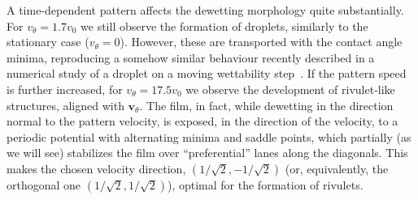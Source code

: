 \documentclass[twocolumn,amsmath,amssymb,showpacs,prl,superscriptaddress]{revtex4-1} %
\begin{document}
A time-dependent pattern affects the dewetting morphology quite substantially.
For $v_{\theta} = 1.7 v_0$ we still observe the formation of droplets, similarly to the stationary case ($v_{\theta} = 0$). However, these are transported with the contact angle minima, reproducing a somehow similar behaviour recently described in a numerical study of a droplet on a moving wettability step~\cite{GrawitterStark1}.
If the pattern speed is further increased, for $v_{\theta} = 17.5 v_0$ we observe the development of rivulet-like structures, aligned with $\mathbf{v}_{\theta}$. 
The film, in fact, while dewetting in the direction normal to the pattern velocity, is exposed, in the direction of the velocity, to a periodic potential with alternating minima and saddle points, which partially (as we will see) stabilizes the film over ``preferential'' lanes along the diagonals. 
This makes the chosen velocity direction, $(1/\sqrt{2},-1/\sqrt{2})$ (or, equivalently, the orthogonal one $(1/\sqrt{2},1/\sqrt{2})$), optimal for the formation of rivulets. 
\end{document}
